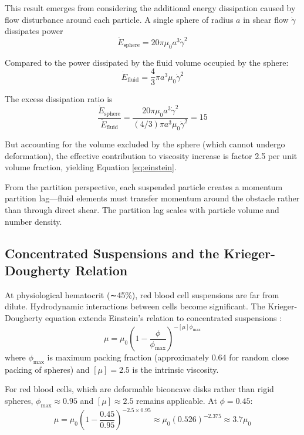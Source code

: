 \documentclass[12pt,a4paper]{article}
\theoremstyle{remark}
\begin{document}
This result emerges from considering the additional energy dissipation caused by flow disturbance around each particle. A single sphere of radius $a$ in shear flow $\dot{\gamma}$ dissipates power
\begin{equation}
\dot{E}_{\mathrm{sphere}} = 20\pi \mu_{0} a^{3} \dot{\gamma}^{2}
\end{equation}

Compared to the power dissipated by the fluid volume occupied by the sphere:
\begin{equation}
\dot{E}_{\mathrm{fluid}} = \frac{4}{3}\pi a^{3} \mu_{0} \dot{\gamma}^{2}
\end{equation}

The excess dissipation ratio is
\begin{equation}
\frac{\dot{E}_{\mathrm{sphere}}}{\dot{E}_{\mathrm{fluid}}} = \frac{20\pi \mu_{0} a^{3} \dot{\gamma}^{2}}{(4/3)\pi a^{3} \mu_{0} \dot{\gamma}^{2}} = 15
\end{equation}

But accounting for the volume excluded by the sphere (which cannot undergo deformation), the effective contribution to viscosity increase is factor 2.5 per unit volume fraction, yielding Equation \ref{eq:einstein}.

From the partition perspective, each suspended particle creates a momentum partition lag—fluid elements must transfer momentum around the obstacle rather than through direct shear. The partition lag scales with particle volume and number density.

\subsection{Concentrated Suspensions and the Krieger-Dougherty Relation}

At physiological hematocrit (∼45\%), red blood cell suspensions are far from dilute. Hydrodynamic interactions between cells become significant. The Krieger-Dougherty equation extends Einstein's relation to concentrated suspensions \cite{krieger1959mechanism}:
\begin{equation}
\mu = \mu_{0}\left(1 - \frac{\phi}{\phi_{\max}}\right)^{-[\mu]\phi_{\max}}
\end{equation}
where $\phi_{\max}$ is maximum packing fraction (approximately 0.64 for random close packing of spheres) and $[\mu] = 2.5$ is the intrinsic viscosity.

For red blood cells, which are deformable biconcave disks rather than rigid spheres, $\phi_{\max} \approx 0.95$ and $[\mu] \approx 2.5$ remains applicable. At $\phi = 0.45$:
\begin{equation}
\mu = \mu_{0}\left(1 - \frac{0.45}{0.95}\right)^{-2.5 \times 0.95} \approx \mu_{0}(0.526)^{-2.375} \approx 3.7\mu_{0}
\end{equation}
\end{document}
